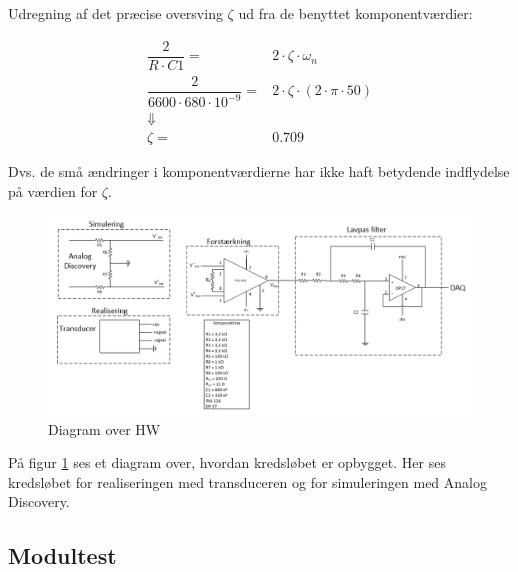 Udregning af det præcise oversving $ \zeta $ ud fra de benyttet komponentværdier:
\begin{ceqn} 
\begin{equation}
\begin{split}
\dfrac{2}{R\cdot C1}=& 2\cdot \zeta\cdot \omega_n\\
\dfrac{2}{6600\cdot 680\cdot 10^{-9}}=& 2\cdot \zeta\cdot (2\cdot \pi \cdot 50)\\
\Downarrow\\
\zeta =& 0.709
\end{split}
\end{equation}
\end{ceqn}
Dvs. de små ændringer i komponentværdierne har ikke haft betydende indflydelse på værdien for $ \zeta $. 

\begin{figure}[H]
	\centering
	\includegraphics[width=1.0\textwidth]{Figurer/diagram_over_HW}
	\caption{Diagram over HW}
	\label{fig:HW}
\end{figure}

På figur \ref{fig:HW} ses et diagram over, hvordan kredsløbet er opbygget. Her ses kredsløbet for realiseringen med transduceren og for simuleringen med Analog Discovery.

\subsection{Modultest}

